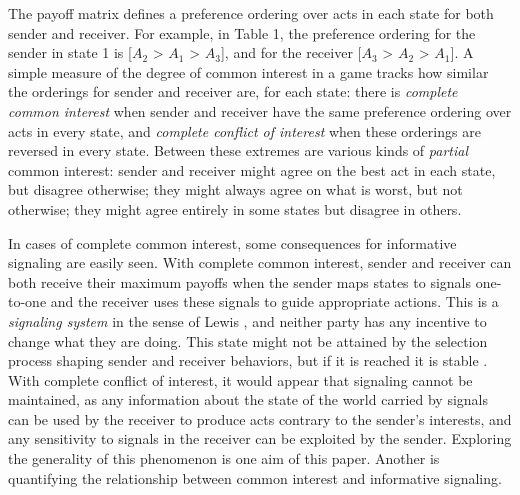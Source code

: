 \documentclass[10pt]{article}
\begin{document}
The payoff matrix defines a preference ordering over acts in each state
for both sender and receiver. For example, in Table 1, the preference
ordering for the sender in state 1 is {[}$A_{2}$
\textgreater{} $A_{1}$ \textgreater{} $A_{3}${]},
and for the receiver {[}$A_{3}$ \textgreater{}
$A_{2}$ \textgreater{} $A_{1}${]}. A simple
measure of the degree of common interest in a game tracks how similar
the orderings for sender and receiver are, for each state: there is
\emph{complete common interest} when sender and receiver have the same
preference ordering over acts in every state, and \emph{complete
conflict of interest} when these orderings are reversed in every state.
Between these extremes are various kinds of \emph{partial} common
interest: sender and receiver might agree on the best act in each state,
but disagree otherwise; they might always agree on what is worst, but
not otherwise; they might agree entirely in some states but disagree in
others.

In cases of complete common interest, some consequences for informative
signaling are easily seen. With complete common interest, sender and
receiver can both receive their maximum payoffs when the sender maps
states to signals one-to-one and the receiver uses these signals to
guide appropriate actions. This is a \emph{signaling system} in the
sense of Lewis \cite{Lewis1969}, and neither party has any incentive to change what
they are doing. This state might not be attained by the selection
process shaping sender and receiver behaviors, but if it is reached it
is stable \cite{Huttegger2010}. With complete conflict of interest, it would appear that
signaling cannot be maintained, as any information about the state of
the world carried by signals can be used by the receiver to produce acts
contrary to the sender's interests, and any sensitivity to signals in
the receiver can be exploited by the sender. Exploring the generality of
this phenomenon is one aim of this paper. Another is quantifying the
relationship between common interest and informative signaling.
\end{document}
